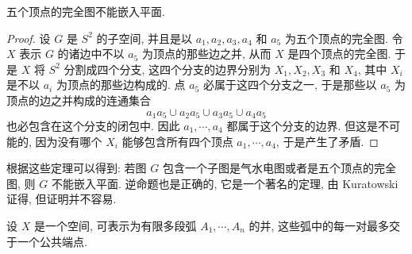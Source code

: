\begin{theorem}\label{ch10:thm-k5-nonplanar}
五个顶点的完全图不能嵌入平面.
\end{theorem}

\begin{proof}
设 $G$ 是 $S^{2}$ 的子空间, 并且是以 $a_{1},a_{2},a_{3},a_{4}$ 和 $a_{5}$ 为五个顶点的完全图. 令 $X$ 表示 $G$ 的诸边中不以 $a_{5}$ 为顶点的那些边之并, 从而 $X$ 是四个顶点的完全图. 于是 $X$ 将 $S^{2}$ 分割成四个分支, 这四个分支的边界分别为 $X_{1},X_{2},X_{3}$ 和 $X_{4}$, 其中 $X_{i}$ 是不以 $a_{i}$ 为顶点的那些边构成的. 点 $a_{5}$ 必属于这四个分支之一, 于是那些以 $a_{5}$ 为顶点的边之并构成的连通集合
\[
a_{1}a_{5}\cup a_{2}a_{5}\cup a_{3}a_{5}\cup a_{4}a_{5}
\]
也必包含在这个分支的闭包中. 因此 $a_{1},\cdots,a_{4}$ 都属于这个分支的边界. 但这是不可能的, 因为没有哪个 $X_{i}$ 能够包含所有四个顶点 $a_{1},\cdots,a_{4}$, 于是产生了矛盾.
\end{proof}

根据这些定理可以得到: 若图 $G$ 包含一个子图是气水电图或者是五个顶点的完全图, 则 $G$ 不能嵌入平面. 逆命题也是正确的, 它是一个著名的定理, 由 Kuratowski 证得, 但证明并不容易.

\begin{exercise}\label{ch10:ex-planar-graph-1}
设 $X$ 是一个空间, 可表示为有限多段弧 $A_{1},\cdots,A_{n}$ 的并, 这些弧中的每一对最多交于一个公共端点.
\end{exercise}